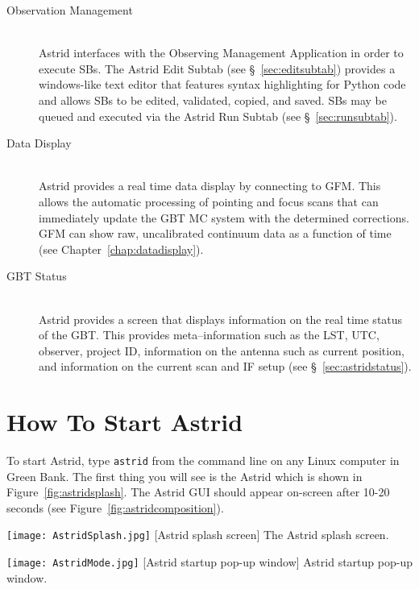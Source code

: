 \begin{description}
\item[Observation Management]\ \\
\gls{Astrid} interfaces with the Observing Management Application in order to
execute \glspl{SB}.  The \gls{Astrid} Edit Subtab (see \S~\ref{sec:editsubtab})
provides a windows-like text editor that features syntax highlighting for
Python code and allows \glspl{SB} to be edited, validated, copied, and saved.
\glspl{SB} may be queued and executed via the \gls{Astrid} Run Subtab
(see \S~\ref{sec:runsubtab}).

\item[Data Display]\ \\
\gls{Astrid} provides a real time data display by connecting to \gls{GFM}.
This allows the automatic processing of pointing and focus scans that can
immediately update the \gls{GBT} \gls{MC} system with the determined
corrections.  \gls{GFM} can show raw, uncalibrated continuum data as
a function of time (see Chapter~\ref{chap:datadisplay}).

\item[GBT Status]\ \\
\gls{Astrid} provides a screen that displays information on the real time
status of the \gls{GBT}. This provides meta--information such as the \gls{LST},
\gls{UTC}, observer, project ID, information on the antenna such as current
position, and information on the current scan and \gls{IF} setup
(see \S~\ref{sec:astridstatus}).
\end{description}

\newpage
\section{How To Start Astrid}\label{sec:startingastrid}
 
To start \gls{Astrid}, type {\tt astrid} from the command line on any Linux
computer in Green Bank. The first thing you will see is the \gls{Astrid}
 which is shown in Figure~\ref{fig:astridsplash}. The
\gls{Astrid} \gls{GUI} should appear on-screen after 10-20 seconds
(see Figure~\ref{fig:astridcomposition}).

\begin{minipage}[b]{0.36\linewidth}
\vspace{0pt}
\texttt{[image: AstridSplash.jpg]}
[Astrid splash screen]
{The \gls{Astrid} splash screen.
\label{fig:astridsplash}}
\end{minipage}
\hfill
\begin{minipage}[b]{0.43\linewidth}
\vspace{0pt}
\texttt{[image: AstridMode.jpg]}
[Astrid startup pop-up window]
{\gls{Astrid} startup pop-up window.
\label{fig:astridmode}}
\end{minipage}

